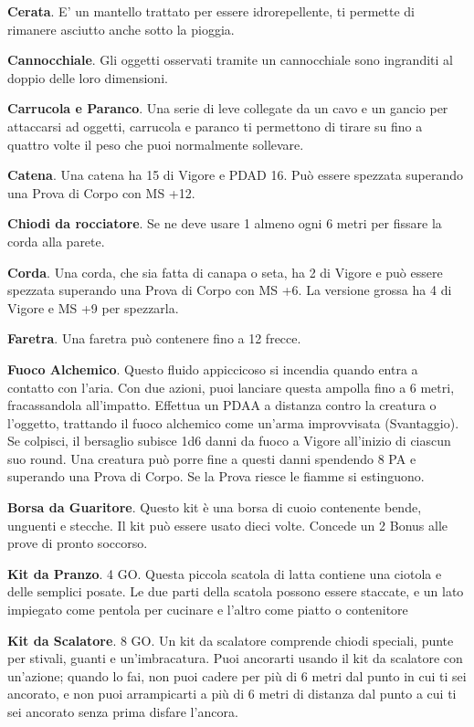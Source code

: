 \documentclass[12pt,a4paper,twoside,openany]{book}
\begin{document}
\begin{multicols}{2}
\textbf{Cerata}. E' un mantello trattato per essere idrorepellente, ti permette di rimanere asciutto anche sotto la pioggia.

\textbf{Cannocchiale}. Gli oggetti osservati tramite un cannocchiale sono ingranditi al doppio delle loro dimensioni.

\textbf{Carrucola e Paranco}. Una serie di leve collegate da un cavo e un gancio per attaccarsi ad oggetti, carrucola e paranco ti permettono di tirare su fino a quattro volte il peso che puoi normalmente sollevare.

\textbf{Catena}. Una catena ha 15 di Vigore e PDAD 16. Può essere spezzata superando una Prova di Corpo con MS +12.

\textbf{Chiodi da rocciatore}. Se ne deve usare 1 almeno ogni 6 metri per fissare la corda alla parete.

\textbf{Corda}. Una corda, che sia fatta di canapa o seta, ha 2 di Vigore e può essere spezzata superando una Prova di Corpo con MS +6. La versione grossa ha 4 di Vigore e MS +9 per spezzarla.

\textbf{Faretra}. Una faretra può contenere fino a 12 frecce.

\textbf{Fuoco Alchemico}. Questo fluido appiccicoso si incendia quando entra a contatto con l’aria. Con due azioni, puoi lanciare questa ampolla fino a 6 metri, fracassandola all’impatto. Effettua un PDAA a distanza contro la creatura o l’oggetto, trattando il fuoco alchemico come un’arma improvvisata (Svantaggio). Se colpisci, il bersaglio subisce 1d6 danni da fuoco a Vigore all’inizio di ciascun suo round. Una creatura può porre fine a questi danni spendendo 8 PA e superando una Prova di Corpo. Se la Prova riesce le fiamme si estinguono.

\textbf{Borsa da Guaritore}. Questo kit è una borsa di cuoio contenente bende, unguenti e stecche. Il kit può essere usato dieci volte. Concede un 2 Bonus alle prove di pronto soccorso.

\textbf{Kit da Pranzo}. 4 GO. Questa piccola scatola di latta contiene una ciotola e delle semplici posate. Le due parti della scatola possono essere staccate, e un lato impiegato come pentola per cucinare e l’altro come piatto o contenitore

\textbf{Kit da Scalatore}. 8 GO. Un kit da scalatore comprende chiodi speciali, punte per stivali, guanti e un’imbracatura. Puoi ancorarti usando il kit da scalatore con un’azione; quando lo fai, non puoi cadere per più di 6 metri dal punto in cui ti sei ancorato, e non puoi arrampicarti a più di 6 metri di distanza dal punto a cui ti sei ancorato senza prima disfare l’ancora.


\end{multicols}
\end{document}

